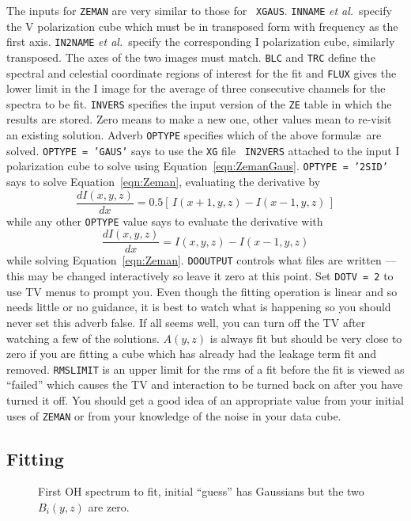 \documentclass[twoside]{article}
\newcommand{\Hi}[1]{\textcolor{hicol}{#1}}
\newcommand{\putfig}[1]{\texttt{[image: \#1.eps]}}
\begin{document}
The inputs for {\tt ZEMAN} are very similar to those for {\tt
  XGAUS}\@.  {\tt INNAME} {\it et al.}~specify the V polarization
cube which must be in transposed form with frequency as the first
axis.  {\tt IN2NAME} {\it et al.}~specify the corresponding I
polarization cube, similarly transposed.  The axes of the two images
must match.  {\tt BLC} and {\tt TRC} define the spectral and celestial
coordinate regions \Hi{of interest} for the fit and {\tt FLUX} gives
the lower limit in the I image for the average of three consecutive
channels for the spectra to be fit.  {\tt INVERS} specifies the input
version of the {\tt ZE} table in which the results are stored.  Zero
means to make a new one, other values mean to re-visit an existing
solution.  Adverb {\tt OPTYPE} specifies which of the above formul\ae\
are solved.  {\tt OPTYPE = 'GAUS'} says to use the {\tt XG} file {\tt
  IN2VERS} attached to the input I polarization cube to solve using
Equation~\ref{eqn:ZemanGaus}.  {\tt OPTYPE = '2SID'} says to solve
Equation~\ref{eqn:Zeman}, evaluating the derivative by
$$
\frac{dI(x,y,z)}{dx} = 0.5 \left[\, I(x+1,y,z) - I(x-1,y,z) \,\right]
$$
while any other {\tt OPTYPE} value says to evaluate the derivative
with
$$
\frac{dI(x,y,z)}{dx} = I(x,y,z) - I(x-1,y,z)
$$
while solving Equation~\ref{eqn:Zeman}.  {\tt DOOUTPUT} controls what
files are written --- this may be changed interactively so leave it
zero at this point.  Set {\tt DOTV = 2} to use TV menus to prompt you.
Even though the fitting operation is linear and so needs little or no
guidance, it is best to watch what is happening so you should never
set this adverb false.  If all seems well, you can turn off the TV
after watching a few of the solutions.  $A(y,z)$ is always fit but
should be very close to zero if you are fitting a cube which has
already had the leakage term fit and removed.  {\tt RMSLIMIT} is an
upper limit for the rms of a fit before the fit is viewed as
``failed'' which causes the TV and interaction to be turned back on
after you have turned it off.  You should get a good idea of an
appropriate value from your initial uses of {\tt ZEMAN} or from your
knowledge of the noise in your data cube.

\subsection{Fitting}

\begin{figure}
\begin{center}
\resizebox{6.0in}{!}{\putfig{ZEMAN.init}}
\caption{First OH spectrum to fit, initial ``guess'' has Gaussians but
   the two $B_i(y,z)$ are zero.}
\label{fig:ZEMAN.init}
\end{center}
\end{figure}
\end{document}
